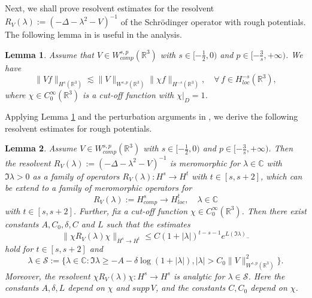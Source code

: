 \documentclass[reqno, 12pt]{amsart}
\newtheorem{Le}{Lemma}[section]
\numberwithin{equation}{section}
\begin{document}
 Next, we shall prove resolvent estimates for the resolvent $R_V(\lambda):=(-\Delta-\lambda^2-V)^{-1}$ of the Schr\"odinger operator with rough potentials. The following lemma in \cite{Caro} is useful in the analysis.  \begin{Le}\label{Lem5.1}
	Assume that $V \in W^{s,p}_{comp}(\mathbb{R}^3)$ with $s \in [-\frac{1}{2},0)$ and $p \in [-\frac{3}{s},  +\infty)$. We have \[
	\|V f\|_{H^{s}(\mathbb{R}^3)} \lesssim \| V\|_{W^{s,p}(\mathbb{R}^3)} \| \chi f\|_{H^{-s}(\mathbb{R}^3)},\quad \forall\, f \in H^{-s}_{loc}(\mathbb{R}^3), 
	\] where $\chi \in C_0^\infty(\mathbb{R}^3)$ is a cut-off function with $\chi|_{D}=1$. 
\end{Le}
Applying Lemma \ref{Lem5.1} and the perturbation arguments in \cite[Theorem 3.10]{dyatlov2019mathematical}, we derive the following resolvent estimates for rough potentials.
\begin{Le}\label{Lem5.2}
	 Assume $V \in W^{s,p}_{comp}(\mathbb{R}^3)$ with $s \in [-\frac{1}{2},0)$ and $p \in [-\frac{3}{s},  +\infty)$. Then the resolvent $R_{ V}(\lambda):=(-\Delta-\lambda^2-V)^{-1}$ is meromorphic for $\lambda \in \mathbb{C}$ with $\Im \lambda>0$ as a family of operators $R_{ V}(\lambda): H^s \to H^t$ with $t \in [s,s+2]$, which can be extend to a family of meromorphic operators for \[
      R_{ V}(\lambda):=H^s_{comp} \to H^t_{loc},\quad \lambda \in \mathbb C
      \] with $t \in [s,s+2]$. Further, fix a cut-off function $\chi \in C_0^\infty(\mathbb{R}^3)$. Then there exist constants $A,C_0,\delta,C$ and $L$ such that the estimates \begin{equation*}
		\|\chi R_V(\lambda) \chi \|_{H^s \to H^t} \le C (1+|\lambda|)^{t-s-1}e^{L (\Im \lambda)_-}
	\end{equation*} hold for $t \in [s,s+2]$ and \[
	\lambda \in \mathscr{S}:=\{\lambda \in \mathbb{C}: \Im \lambda \ge -A-\delta \log(1+|\lambda|), |\lambda|>C_0\| V\|^2_{W^{s,p}(\mathbb{R}^3)}\}.
	\]  Moreover, the resolvent $\chi R_{ V}(\lambda) \chi: H^s\to H^s$ is analytic for $\lambda \in \mathscr{S}$.  Here the constants $A,\delta,L$ depend on $\chi$ and $supp\, V$, and the constants $C, C_0$ depend on $\chi$.
\end{Le}
\end{document}
